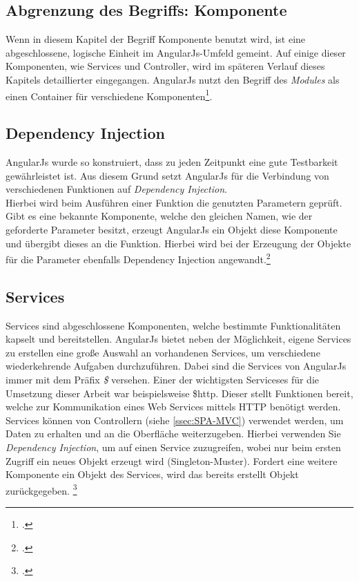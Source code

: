 \subsection{Abgrenzung des Begriffs: Komponente}
Wenn in diesem Kapitel der Begriff Komponente benutzt wird, ist eine abgeschlossene, logische Einheit im AngularJs-Umfeld gemeint. Auf einige dieser Komponenten, wie Services und Controller, wird im späteren Verlauf dieses Kapitels detaillierter eingegangen. AngularJs nutzt den Begriff des \textit{Modules} als einen Container für verschiedene Komponenten\footcite{online:angular:module}. 
\subsection{Dependency Injection}
\label{ssec:SPA-Dependency-Injection}
AngularJs wurde so konstruiert, dass zu jeden Zeitpunkt eine gute Testbarkeit gewährleistet ist. Aus diesem Grund setzt AngularJs für die Verbindung von verschiedenen Funktionen auf \textit{Dependency Injection}. \\ Hierbei wird beim Ausführen einer Funktion die genutzten Parametern geprüft. Gibt es eine bekannte Komponente, welche den gleichen Namen, wie der geforderte Parameter besitzt, erzeugt AngularJs ein Objekt diese Komponente und übergibt dieses an die Funktion. Hierbei wird bei der Erzeugung der Objekte für die Parameter ebenfalls Dependency Injection angewandt.\footcite{online:angularjs:dependency-injection}
\subsection{Services}
\label{ssec:SPA-Services}
Services sind abgeschlossene Komponenten, welche bestimmte Funktionalitäten kapselt und bereitstellen. AngularJs bietet neben der Möglichkeit, eigene Services zu erstellen eine große Auswahl an vorhandenen Services, um verschiedene wiederkehrende Aufgaben durchzuführen. Dabei sind die Services von AngularJs immer mit dem Präfix \textit{\$} versehen. Einer der wichtigsten Serviceses für die Umsetzung dieser Arbeit war beispielsweise \$http. Dieser stellt Funktionen bereit, welche zur Kommunikation eines Web Services mittels HTTP benötigt werden. \\
Services können von Controllern (siehe \ref{ssec:SPA-MVC}) verwendet werden, um Daten zu erhalten und an die Oberfläche weiterzugeben. Hierbei verwenden Sie \textit{Dependency Injection}, um auf einen Service zuzugreifen, wobei nur beim ersten Zugriff ein neues Objekt erzeugt wird (\ac{Singleton}-Muster). Fordert eine weitere Komponente ein Objekt des Services, wird das bereits erstellt Objekt zurückgegeben. \footcite{online:angular:services}
